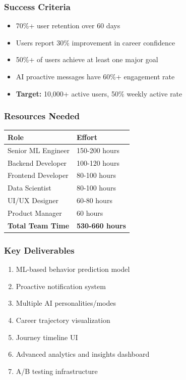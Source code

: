 \documentclass[12pt,a4paper]{article}
\begin{document}
\subsubsection{Success Criteria}

\begin{itemize}
    \item 70\%+ user retention over 60 days
    \item Users report 30\% improvement in career confidence
    \item 50\%+ of users achieve at least one major goal
    \item AI proactive messages have 60\%+ engagement rate
    \item \textbf{Target:} 10,000+ active users, 50\% weekly active rate
\end{itemize}

\subsubsection{Resources Needed}

\begin{table}[h]
\centering
\begin{tabular}{|l|l|}
\hline
\textbf{Role} & \textbf{Effort} \\
\hline
Senior ML Engineer & 150-200 hours \\
\hline
Backend Developer & 100-120 hours \\
\hline
Frontend Developer & 80-100 hours \\
\hline
Data Scientist & 80-100 hours \\
\hline
UI/UX Designer & 60-80 hours \\
\hline
Product Manager & 60 hours \\
\hline
\textbf{Total Team Time} & \textbf{530-660 hours} \\
\hline
\end{tabular}
\end{table}

\subsubsection{Key Deliverables}

\begin{enumerate}
    \item ML-based behavior prediction model
    \item Proactive notification system
    \item Multiple AI personalities/modes
    \item Career trajectory visualization
    \item Journey timeline UI
    \item Advanced analytics and insights dashboard
    \item A/B testing infrastructure
\end{enumerate}
\end{document}

